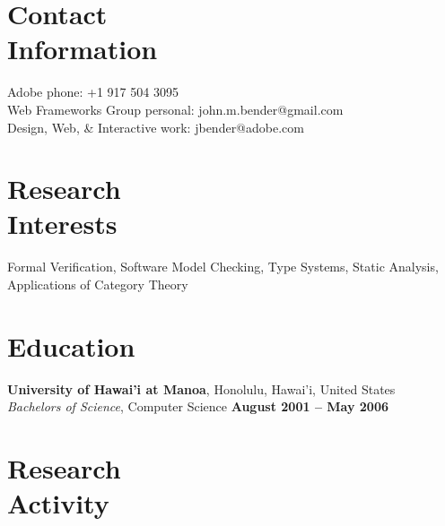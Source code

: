 \documentclass[margin,line]{resume}
\begin{document}
\begin{resume}

    \section{\mysidestyle Contact\\Information}

    Adobe                            \hfill phone: +1 917 504 3095           \vspace{0mm}\\\vspace{0mm}%
    Web Frameworks Group                          \hfill personal: john.m.bender@gmail.com          \vspace{0mm}\\\vspace{0mm}%
    Design, Web, \& Interactive                          \hfill work: jbender@adobe.com          \vspace{0mm}\\\vspace{0mm}%


    \section{\mysidestyle Research\\Interests}

    Formal Verification, Software Model Checking, Type Systems, Static Analysis, Applications of Category Theory


    \section{\mysidestyle Education}

    \textbf{University of Hawai'i at Manoa}, Honolulu, Hawai'i, United States \vspace{2mm}\\\vspace{1mm}%
    \textsl{Bachelors of Science}, Computer Science \hfill \textbf{ August 2001 -- May 2006}\vspace{-3mm}\\\vspace{-1mm}%


    \section{\mysidestyle Research\\Activity}


\end{resume}
\end{document}
